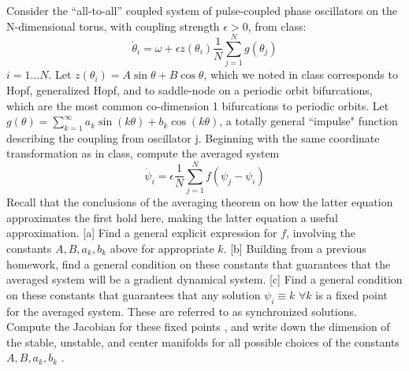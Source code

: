 \documentclass[12pt]{report}
\begin{document}
\begin{problem}
    Consider the ``all-to-all'' coupled system of pulse-coupled phase oscillators on the N-dimensional torus, with coupling strength $\epsilon>0$, from class:
    \begin{equation}
    \dot \theta_i = \omega + \epsilon z(\theta_i) \frac{1}{N} \sum_{j=1}^N g(\theta_j)  
    \end{equation}
    $i=1...N$.  Let $z(\theta_i)=A \sin \theta + B \cos \theta $, which we noted in class corresponds to Hopf, generalized Hopf, and to saddle-node on a periodic orbit bifurcations, which are the most common co-dimension 1 bifurcations to periodic orbits.  Let $g(\theta) = \sum_{k=1}^\infty a_k \sin(k \theta) + b_k \cos(k \theta)$, a totally general ``impulse" function describing the coupling from oscillator j.  Beginning with the same coordinate transformation as in class, compute the averaged system
    \begin{equation}
    \dot \psi_i =  \epsilon  \frac{1}{N} \sum_{j=1}^N f(\psi_j - \psi_i)  
    \end{equation} 
    Recall that the conclusions of the averaging theorem on how the latter equation approximates the first hold here, making the latter equation a useful approximation.
    [a] Find a general explicit expression for $f$, involving the constants $A,B, a_k, b_k$ above for appropriate $k$.
    [b] Building from a previous homework, find a general condition on these constants that guarantees that the averaged system will be a gradient dynamical system.
    [c] Find a general condition on these constants that guarantees that any solution $\psi_i \equiv k$ $\forall k$ is a fixed point for the averaged system.  These are referred to as synchronized solutions. Compute the Jacobian for these fixed points , and write down the dimension of the stable, unstable, and center manifolds for all possible choices of the  constants $A,B, a_k, b_k$ .
\end{problem}
\end{document}
